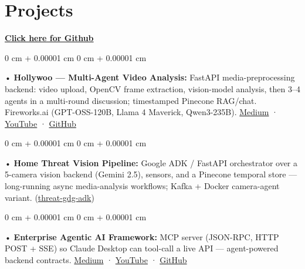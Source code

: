 \documentclass[10pt, letterpaper]{article}
\newenvironment{onecolentry}{
    \begin{adjustwidth}{
        0 cm + 0.00001 cm
    }{
        0 cm + 0.00001 cm
    }
}{
    \end{adjustwidth}
} %
\begin{document}
\section{Projects}
    \vspace{2 pt}
\textbf{\href{https://github.com/daedalus-s}{Click here for Github}}
\begin{onecolentry}
     • \textbf{Hollywoo — Multi-Agent Video Analysis:} FastAPI media-preprocessing backend: video upload, OpenCV frame extraction, vision-model analysis, then 3--4 agents in a multi-round discussion; timestamped Pinecone RAG/chat. Fireworks.ai (GPT-OSS-120B, Llama 4 Maverick, Qwen3-235B). \href{https://medium.com/@sreenikethaathreya/hollywoo-ai-video-analysis-5eae37ca7e16}{Medium} · \href{https://www.youtube.com/watch?v=KBs_3V0OAgU}{YouTube} · \href{https://github.com/daedalus-s/fireworks-video-discussion}{GitHub}
\end{onecolentry}
\begin{onecolentry}
     • \textbf{Home Threat Vision Pipeline:} Google ADK / FastAPI orchestrator over a 5-camera vision backend (Gemini 2.5), sensors, and a Pinecone temporal store — long-running async media-analysis workflows; Kafka + Docker camera-agent variant. (\href{https://github.com/daedalus-s/threat-gdg-adk}{threat-gdg-adk})
\end{onecolentry}
\begin{onecolentry}
     • \textbf{Enterprise Agentic AI Framework:} MCP server (JSON-RPC, HTTP POST + SSE) so Claude Desktop can tool-call a live API — agent-powered backend contracts. \href{https://medium.com/@sreenikethaathreya/get-good-at-using-ai-noob-5d2576203112}{Medium} · \href{https://www.youtube.com/watch?v=op2gTYyFb5U}{YouTube} · \href{https://github.com/daedalus-s/dota2-mcp-server}{GitHub}
\end{onecolentry}
\vspace{2 pt}
        \vspace{2 pt }
\end{document}
